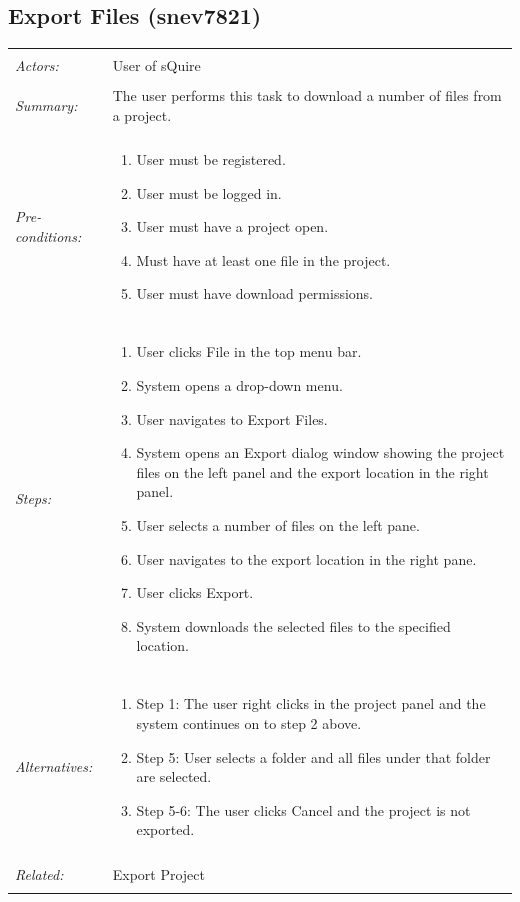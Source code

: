 \documentclass[11pt]{report}
\begin{document}
\subsection{Export Files (snev7821)}
\begin{tabular}{ p{2cm} p{12cm} }
\hline
	\\
	\textit{Actors:} & User of sQuire \\
	\\
	\textit{Summary:} & The user performs this task to download a number of files from a project. \\
	\\
	\textit{Pre-conditions:} &  \begin{enumerate}
		\item User must be registered.
		\item User must be logged in.
		\item User must have a project open.
		\item Must have at least one file in the project.
		\item User must have download permissions.
	\end{enumerate} \\
	\\
	\textit{Steps:} & \begin{enumerate}
		\item User clicks File in the top menu bar.
		\item System opens a drop-down menu.
		\item User navigates to Export Files.
		\item System opens an Export dialog window showing the project files on the left panel and the export location in the right panel.
		\item User selects a number of files on the left pane.
		\item User navigates to the export location in the right pane.
		\item User clicks Export.
		\item System downloads the selected files to the specified location.
	\end{enumerate} \\
	\\
	\textit{Alternatives:} & \begin{enumerate}
		\item Step 1: The user right clicks in the project panel and the system continues on to step 2 above.
		\item Step 5: User selects a folder and all files under that folder are selected.
		\item Step 5-6: The user clicks Cancel and the project is not exported.
	\end{enumerate} \\
	\\
	\textit{Related:} & Export Project \\
	\\
\hline
\end{tabular}
\newpage
\end{document}
